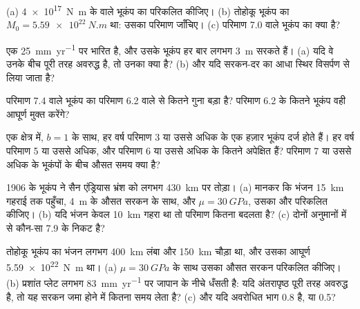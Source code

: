 \begin{exercise}[$\star$]
\label{exo:b1:earthquake-source:1}
(a) \qty{4e17}{N.m} के  वाले भूकंप का  परिकलित कीजिए। (b) तोहोकू भूकंप का $M_0 = \qty{5.59e22}{N.m}$ था: उसका परिमाण जाँचिए। (c) परिमाण 7.0 वाले भूकंप का  क्या है?
\end{exercise}

\begin{exercise}[$\star$]
\label{exo:b1:earthquake-source:2}
एक  \qty{25}{mm.yr^{-1}} पर भारित है, और उसके भूकंप हर बार लगभग \qty{3}{m} सरकते हैं। (a) यदि वे उनके बीच पूरी तरह अवरुद्ध है, तो उनका  क्या है? (b) और यदि सरकन-दर का आधा स्थिर विसर्पण से लिया जाता है?
\end{exercise}

\begin{exercise}[$\star$]
\label{exo:b1:earthquake-source:3}
परिमाण 7.4 वाले भूकंप का  परिमाण 6.2 वाले से कितने गुना बड़ा है? परिमाण 6.2 के कितने भूकंप वही आघूर्ण मुक्त करेंगे?
\end{exercise}

\begin{exercise}[$\star$]
\label{exo:b1:earthquake-source:4}
एक क्षेत्र में, $b = 1$ के साथ, हर वर्ष परिमाण 3 या उससे अधिक के एक हज़ार भूकंप दर्ज होते हैं। हर वर्ष परिमाण 5 या उससे अधिक, और परिमाण 6 या उससे अधिक के कितने अपेक्षित हैं? परिमाण 7 या उससे अधिक के भूकंपों के बीच औसत समय क्या है?
\end{exercise}

\begin{exercise}[$\star\star$]
\label{exo:b1:earthquake-source:5}
1906 के भूकंप ने सैन एंड्रियास भ्रंश को लगभग \qty{430}{km} पर तोड़ा। (a) मानकर कि भंजन \qty{15}{km} गहराई तक पहुँचा, \qty{4}{m} के औसत सरकन के साथ, और $\mu = \qty{30}{GPa}$, उसका  और  परिकलित कीजिए। (b) यदि भंजन केवल \qty{10}{km} गहरा था तो परिमाण कितना बदलता है? (c) दोनों अनुमानों में से कौन-सा 7.9 के निकट है?
\end{exercise}

\begin{exercise}[$\star\star$]
\label{exo:b1:earthquake-source:6}
तोहोकू भूकंप का भंजन लगभग \qty{400}{km} लंबा और \qty{150}{km} चौड़ा था, और उसका आघूर्ण \qty{5.59e22}{N.m} था। (a) $\mu = \qty{30}{GPa}$ के साथ उसका औसत सरकन परिकलित कीजिए। (b) प्रशांत प्लेट लगभग \qty{83}{mm.yr^{-1}} पर जापान के नीचे धँसती है: यदि अंतरापृष्ठ पूरी तरह अवरुद्ध है, तो यह सरकन जमा होने में कितना समय लेता है? (c) और यदि अवरोधित भाग 0.8 है, या 0.5?
\end{exercise}

